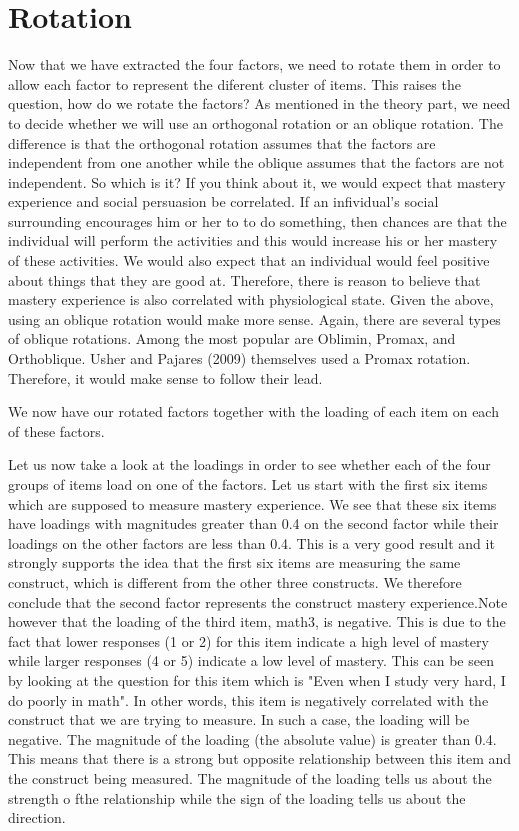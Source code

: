 \documentclass[a4paper,12pt,oneside]{book}
\begin{document}
\section{Rotation}
Now that we have extracted the four factors, we need to rotate them in order to allow each factor to represent the diferent cluster of items.
This raises the question, how do we rotate the factors? As mentioned in the theory part, we need to decide whether we will use an orthogonal rotation
or an oblique rotation. The difference is that the orthogonal rotation assumes that the factors are independent from one another while the oblique
assumes that the factors are not independent. So which is it? If you think about it, we would expect that mastery experience and social persuasion
be correlated. If an infividual's social surrounding encourages him or her to to do something, then chances are that the individual will perform
the activities and this would increase his or her mastery of these activities. We would also expect that an individual would feel positive about
things that they are good at. Therefore, there is reason to believe that mastery experience is also correlated with physiological state. Given the
above, using an oblique rotation would make more sense. Again, there are several types of oblique rotations. Among the most popular are Oblimin, 
Promax, and Orthoblique. Usher and Pajares (2009) themselves used a Promax rotation. Therefore, it would make sense to follow their lead. 

\begin{stlog}\end{stlog}

We now have our rotated factors together with the loading of each item on each of these factors. 

Let us now take a look at the loadings in order to see whether each of the four groups of items load on one of the factors. Let us start with the 
first six items which are supposed to measure mastery experience. We see that these six items have loadings with magnitudes greater than 0.4 on the
second factor while their loadings on the other factors are less than 0.4. This is a very good result and it strongly supports the idea that the
first six items are measuring the same construct, which is different from the other three constructs. We therefore conclude that the second factor 
represents the construct mastery experience.Note however that the loading of the third item, 
math3, is negative. This is due to the fact that lower responses (1 or 2) for this item indicate a high level of mastery while larger responses (4 or
5) indicate a low level of mastery. This can be seen by looking at the question for this item which is "Even when I study very hard, I do poorly in 
math". In other words, this item is negatively correlated with the construct that we are trying to measure. In such a case, the loading will be
negative. The magnitude of the loading (the absolute value) is greater than 0.4. This means that there is a strong but opposite relationship
between this item and the construct being measured. The magnitude of the loading tells us about the strength o fthe relationship while the sign of the 
loading tells us about the direction. 
\end{document}
